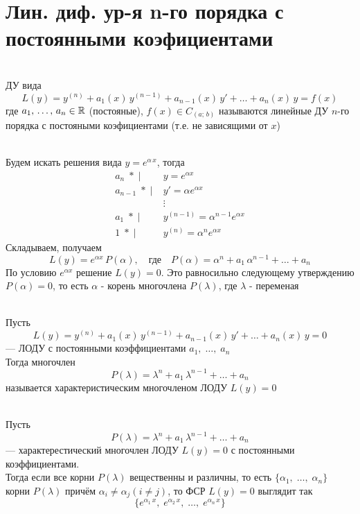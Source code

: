 \section{Лин. диф. ур-я n-го порядка с постоянными коэфициентами}

\begin{Def}~\\
    ДУ вида
    \[
        L(y)=y^{(n)}+a_1(x)\,y^{(n-1)}+a_{n-1}(x)\,y'+\dots+a_n(x)\,y=f(x)
    \]
    где $a_1,\, \dots,\, a_n \in \mathbb{R}$ (постояные), $f(x)\in C_{(a;\,b)}$ называются линейные ДУ $n$-го порядка с постояными коэфициентами (т.е. не зависящими от $x$)
\end{Def}

\begin{Note} [Основа метода реш. ДУ $L(y)=0$]~\\
    Будем искать решения вида $y = e^{\alpha\, x}$, тогда
    \begin{align*}
        a_n\; * \; | \; &y=e^{\alpha x} \\
        a_{n-1}\; * \; | \; &y'=\alpha e^{\alpha x} \\
         &\vdots\\
        a_1\; * \; | \; &y^{(n-1)}=\alpha^{n-1} e^{\alpha x} \\
        1\; * \; | \; &y^{(n)}=\alpha^{n} e^{\alpha x}
    \end{align*}
    Складываем, получаем
    \[
        L(y)=e^{\alpha x}\,P(\alpha), \quad \text{где} \quad P(\alpha)=\alpha^n+a_1\,\alpha^{n-1}+\dots+a_n
    \]
    По условию $e^{\alpha x}$ решение $L(y)=0$. Это равносильно следующему утверждению $P(\alpha) = 0$, то есть $\alpha$ - корень многочлена $P(\lambda)$, где $\lambda$ - переменая
\end{Note}

\begin{Def}~\\
    Пусть
    \[
        L(y)=y^{(n)}+a_1(x)\,y^{(n-1)}+a_{n-1}(x)\,y'+\dots+a_n(x)\,y=0
    \] 
    --- ЛОДУ с постоянными коэффициентами $a_1,\; \dots,\; a_n$\\
    Тогда многочлен 
    \[
        P(\lambda) = \lambda^n+a_1\,\lambda^{n-1}+\dots+a_n
    \] 
    называется характеристическим многочленом ЛОДУ $L(y)=0$\\
\end{Def}

\begin{Th}~\\
    Пусть
    \[
        P(\lambda) = \lambda^n+a_1\,\lambda^{n-1}+\dots+a_n
    \]
    --- характерестический многочлен ЛОДУ $L(y)=0$ с постоянными коэффициентами.\\
    Тогда если все корни $P(\lambda)$ вещественны и различны, то есть $\{\alpha_1,\; \dots,\; \alpha_n\}$ корни $P(\lambda)$ причём $\alpha_i \neq \alpha_j (i \neq j)$, то ФСР $L(y)=0$ выглядит так
    \[
        \{e^{\alpha_1\,x},\; e^{\alpha_2\,x},\; \dots,\; e^{\alpha_n\,x}\}
    \]
\end{Th}

